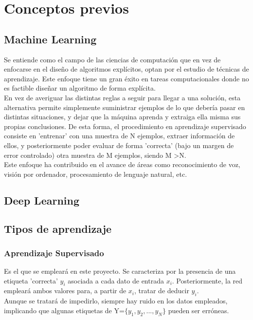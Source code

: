 \chapter{Conceptos previos}


\section{Machine Learning}

Se entiende como el campo de las ciencias de computación que en vez de enfocarse en el diseño de algoritmos explícitos, optan por el estudio de técnicas de aprendizaje. Este enfoque tiene un gran éxito en tareas computacionales donde no es factible diseñar un algoritmo de forma explícita. \cite{Programming_Massively} \\
En vez de averiguar las distintas reglas a seguir para llegar a una solución, esta alternativa permite simplemente suministrar ejemplos de lo que debería pasar en distintas situaciones, y dejar que la máquina aprenda y extraiga ella misma sus propias conclusiones. De esta forma, el procedimiento en aprendizaje supervisado consiste en 'entrenar' con una muestra de N ejemplos, extraer información de ellos, y posteriormente poder evaluar de forma 'correcta' (bajo un margen de error controlado) otra muestra de M ejemplos, siendo M \textgreater N. \cite{Learning_From_Data} \\
Este enfoque ha contribuido en el avance de áreas como reconocimiento de voz, visión por ordenador, procesamiento de lenguaje natural, etc.


\section{Deep Learning}

\section{Tipos de aprendizaje}

\subsection{Aprendizaje Supervisado}


Es el que se empleará en este proyecto. 
Se caracteriza por la presencia de una etiqueta 'correcta' $y_i$ asociada a cada dato de entrada $x_i$. Posteriormente, la red empleará ambos valores para, a partir de $x_i$, tratar de deducir $y_i$. \cite{Learning_From_Data} \\
Aunque se tratará de impedirlo, siempre hay ruido en los datos empleados, implicando que algunas etiquetas de Y=$\{y_1, y_2, ..., y_N\}$ pueden ser erróneas. \\

